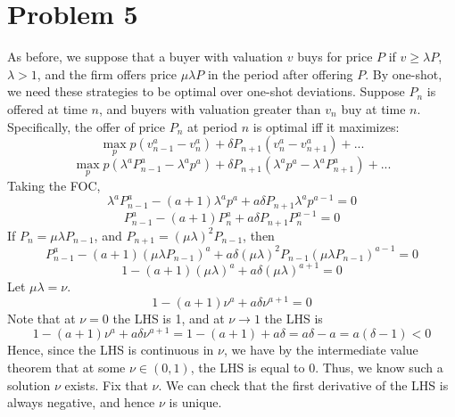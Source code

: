 \documentclass[10pt,letter]{article}
\begin{document}
\section*{Problem 5}
As before, we suppose that a buyer with valuation $v$ buys for price $P$ if $v \ge \lambda P$, $\lambda > 1$, and the firm offers price $\mu\lambda P$ in the period after offering $P$. By one-shot, we need these strategies to be optimal over one-shot deviations. Suppose $P_n$ is offered at time $n$, and buyers with valuation greater than $v_n$ buy at time $n$. Specifically, the offer of price $P_n$ at period $n$ is optimal iff it maximizes:
\[ \max_p p(v_{n-1}^a - v_n^a) + \delta P_{n+1}(v_n^a - v_{n+1}^a) + ... \]
\[ \max_p p(\lambda^a P_{n-1}^a - \lambda^a p^a) + \delta P_{n+1}(\lambda^a p^{a} - \lambda^a P_{n+1}^a) + ... \]
Taking the FOC,
\[ \lambda^a P_{n-1}^a - (a + 1)\lambda^a p^{a} + a \delta P_{n+1}\lambda^a p^{a- 1} = 0  \]
\[  P_{n-1}^a - (a + 1) P_n^{a} + a \delta P_{n+1} P_n^{a- 1} = 0  \]
If $P_n = \mu \lambda P_{n-1}$, and $P_{n+1} = (\mu\lambda)^2 P_{n-1}$, then
\[  P_{n-1}^a - (a + 1) (\mu \lambda P_{n-1})^{a} + a \delta (\mu\lambda)^2P_{n-1} (\mu\lambda P_{n-1})^{a- 1} = 0  \]
\[  1- (a + 1) (\mu \lambda )^{a} + a \delta (\mu\lambda )^{a + 1} = 0  \]
Let $\mu\lambda = \nu$.
\[  1 -  (a+1)\nu^a + a \delta \nu^{a+1}  = 0   \]
Note that at $\nu = 0$ the LHS is 1, and at $\nu \to 1$ the LHS is
\[ 1 - (a+1)\nu^a + a\delta \nu^{a+1} =1 - (a+1) + a\delta = a\delta - a = a(\delta - 1) < 0\]
Hence, since the LHS is continuous in $\nu$, we have by the intermediate value theorem that at some $\nu \in (0,1)$, the LHS is equal to 0. Thus, we know such a solution $\nu$ exists. Fix that $\nu$. We can check that the first derivative of the LHS is always negative, and hence $\nu$ is unique.
\end{document}
